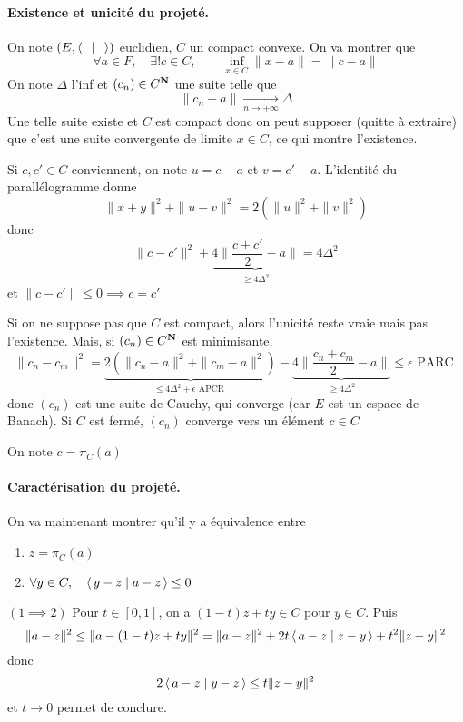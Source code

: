 \paragraph*{Existence et unicité du projeté.}
On note $(E, \scalar{\;}{\;} )$ euclidien, $C$ un compact convexe. On va montrer que  \[
\forall  a \in  F, \quad  \exists  ! c \in  C, \qquad  \inf_{x \in  C}\|x-a\|=\|c-a\|
\] 
On note $\Delta$ l'inf et  $(c_n) \in  C^{\mathbf N}$ une suite telle que \[
\|c_n-a\| \xrightarrow[n\to+\infty]{}\Delta
\] 
Une telle suite existe et $C$ est compact donc on peut supposer (quitte à extraire) que c'est une suite convergente de limite  $x \in  C$, ce qui montre l'existence.

Si $c, c' \in  C$ conviennent, on note $u=c-a$ et  $v=c'-a$. L'identité du parallélogramme donne  \[
    \|x+y\|^2 + \|u-v\|^2 =2(\|u\|^2 + \|v\|^2 )
\] 
donc \[
    \|c-c'\|^2 +\underbrace{4 \|\frac{c+c'}{2}-a\|}_{\geq 4\Delta^2}=4\Delta^2
\] 
et $\|c-c'\|\leq 0 \implies c=c'$

\begin{rem}
    Si on ne suppose pas que $C$ est compact, alors l'unicité reste vraie mais pas l'existence. Mais, si  $(c_n) \in  C^{\mathbf N}$ est minimisante, \[
        \|c_n-c_m\|^2 =\underbrace{2(\|c_n-a\|^2 +\|c_m-a\|^2 )}_{\leq 4\Delta^2+\epsilon \text{ APCR }}-\underbrace{4 \|\frac{c_n+c_m}{2}-a\|}_{\geq 4\Delta^2} \leq \epsilon\text{ PARC }
    \] 
    donc $(c_n)$ est une suite de Cauchy, qui converge (car $E$ est un espace de Banach). Si $C$ est fermé,  $(c_n)$ converge vers un élément  $c \in  C$
\end{rem}

\begin{notation}
    On note $c=\pi_C(a)$
\end{notation}

\paragraph*{Caractérisation du projeté.}
On va maintenant montrer qu'il y a équivalence entre \begin{enumerate}
    \item $z=\pi_C(a)$
    \item $\forall  y \in  C, \quad  \scalar{y-z}{a-z} \leq 0$
\end{enumerate}

$(1\implies 2)$ Pour $t \in  [0, 1]$, on a $(1-t)z+ty \in  C$ pour $y \in  C$. Puis \[
    \|a-z\|^2 \leq \|a-(1-t)z+ty\|^2 =\|a-z\|^2 +2t \scalar{a-z}{z-y} +t^2 \|z-y\|^2 
\] 
donc \[
2 \scalar{a-z}{y-z} \leq t \|z-y\|^2 
\] 
et $t \to  0$ permet de conclure.

